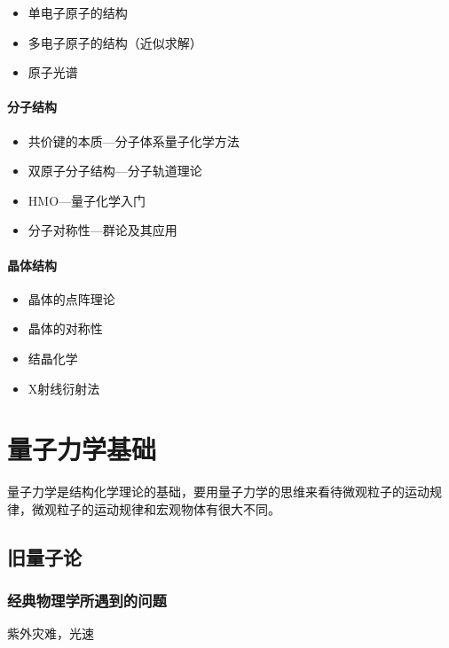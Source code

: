 \documentclass[a4paper]{ctexrep}
\begin{document}
    \begin{itemize}
        \item 单电子原子的结构 
        \item 多电子原子的结构（近似求解）
        \item 原子光谱
    \end{itemize}

    \subsubsection{分子结构}

    \begin{itemize}
        \item 共价键的本质---分子体系量子化学方法
        \item 双原子分子结构---分子轨道理论
        \item HMO---量子化学入门
        \item 分子对称性---群论及其应用
    \end{itemize}

    \subsubsection{晶体结构}

    \begin{itemize}
        \item 晶体的点阵理论
        \item 晶体的对称性
        \item 结晶化学
        \item X射线衍射法
    \end{itemize}

    \subsubsection{}

    \chapter{量子力学基础}

    量子力学是结构化学理论的基础，要用量子力学的思维来看待微观粒子的运动规律，微观粒子的运动规律和宏观物体有很大不同。

    \section{旧量子论}

    \subsection{经典物理学所遇到的问题}
        紫外灾难，光速
\end{document}
